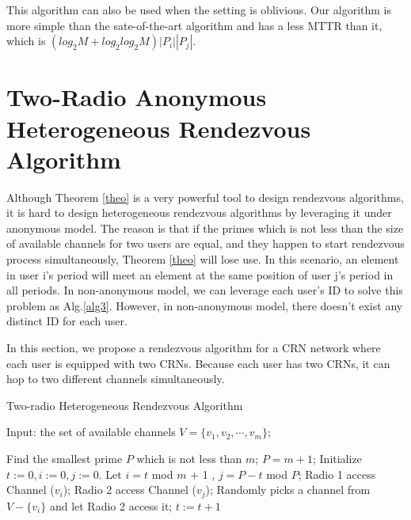 \documentclass[10pt, conference, letterpaper]{IEEEtran}
\begin{document}
This algorithm can also be used when the setting is oblivious. Our algorithm is more simple than the sate-of-the-art algorithm and has a less MTTR than it, which is $(log_2M +log_2log_2M)|P_i||P_j|$.


\section{Two-Radio Anonymous Heterogeneous Rendezvous Algorithm}

Although Theorem \ref{theo} is a very powerful tool to design rendezvous algorithms, it is hard to design heterogeneous rendezvous algorithms by leveraging it under anonymous model. The reason is that if the primes which is not less than the size of available channels for two users are equal, and they happen to start rendezvous process simultaneously, Theorem \ref{theo} will lose use. In this scenario, an element in user i's period will meet an element at the same position of user j's period in all periods. In non-anonymous model, we can leverage each user's ID to solve this problem as Alg.\ref{alg3}. However, in non-anonymous model, there doesn't exist any distinct ID for each user.

In this section, we propose a rendezvous algorithm for a CRN network where each user is equipped with two CRNs. Because each user has two CRNs, it can hop to two different channels simultaneously.

\begin{algorithm}
\caption{Two-radio Heterogeneous Rendezvous Algorithm}
\label{alg4}
\begin{algorithmic}[1]
\STATE Input: the set of available channels $V=\{v_1,v_2,\cdots,v_m\}$;

\STATE Find the smallest prime $P$ which is not less than $m$;
\STATE $P = m + 1$;
\ENDIF
\STATE Initialize $t:=0, i := 0,j:=0$.
\STATE Let $i = t$ mod $m$ + 1 , $j = P - t$ mod $P$;
\STATE Radio 1 access Channel ($v_i$);
\STATE Radio 2 access Channel ($v_j$);
\ELSE
\STATE Randomly picks a channel from $V - \{v_{i}\}$ and let Radio 2 access it;
\ENDIF
\STATE $t:=t+1$
\ENDWHILE
\end{algorithmic}
\end{algorithm}
\end{document}
